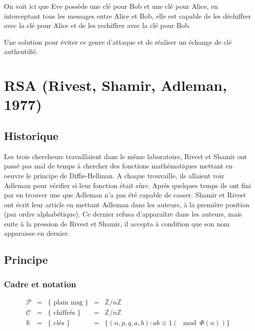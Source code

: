 \documentclass[a4paper, 10pt]{thesis}
\begin{document}
On voit ici que Eve possède une clé pour Bob et une clé pour Alice, en interceptant tous les
messages entre Alice et Bob, elle est capable de les déchiffrer avec la clé pour Alice et de les
rechiffrer avec la clé pour Bob.

Une solution pour éviter ce genre d'attaque et de réaliser un échange de clé authentifié.

\section{RSA (Rivest, Shamir, Adleman, 1977)}

\subsection{Historique}

Les trois chercheurs travaillaient dans le même laboratoire, Rivest et Shamir ont passé pas mal de
temps à chercher des fonctions mathématiques mettant en oeuvre le principe de Diffie-Hellman. A
chaque trouvaille, ils allaient voir Adleman pour vérifier si leur fonction était sûre. Après
quelques temps ils ont fini par en trouver une que Adleman n'a pas été capable de casser. Shamir et
Rivest ont écrit leur article en mettant Adleman dans les auteurs, à la première position (par ordre
alphabétique). Ce dernier refusa d'apparaître dans les auteurs, mais suite à la pression de Rivest
et Shamir, il accepta à condition que son nom apparaisse en dernier.

\subsection{Principe}

\subsubsection{Cadre et notation}

\begin{displaymath}
    \begin{array}{ccccc}
        \mathcal{P} & = & \{ \mbox{ plain msg } \} & = & \mathbb{Z}/ n\mathbb{Z} \\
        \mathcal{C} & = & \{ \mbox{ chiffrés } \} & = & \mathbb{Z} / n\mathbb{Z} \\
        \mathbb{K} & = & \{ \mbox{ clés } \} & = & \{ (n, p, q, a, b) : ab \equiv 1 (\mod \Phi(n))\}
    \end{array}
\end{displaymath}
\end{document}
